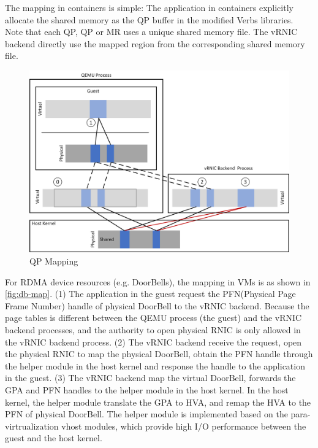  The mapping in containers is simple: The application in containers explicitly allocate the shared memory as the QP buffer in the modified Verbs libraries. Note that each QP, QP or MR uses a unique shared memory file. The vRNIC backend directly use the mapped region from the corresponding shared memory file.
\begin{figure}[!ht]
	\centering
	\includegraphics[width=1\linewidth]{images/qp-map.png}
	\caption{QP Mapping}
	\label{fig:qp-map}
\end{figure}

 

 For RDMA device resources (e.g. DoorBells), the mapping in VMs is as shown in  \ref{fig:db-map}. (1) The application in the guest request the PFN(Physical Page Frame Number) handle of physical DoorBell to the vRNIC backend. Because the page tables is different between the QEMU process (the guest) and the vRNIC backend processes, and the authority to open physical RNIC is only allowed in the vRNIC backend process. (2) The vRNIC backend receive the request, open the physical RNIC to map the physical DoorBell, obtain the PFN handle through the helper module in the host kernel and response the handle to the application in the guest. (3) The vRNIC backend map the virtual DoorBell, forwards the GPA and PFN handles to the helper module in the host kernel. In the host kernel, the helper module translate the GPA to HVA, and remap the HVA to the PFN of physical DoorBell. The helper module is implemented based on the para-virtrualization vhost modules, which provide high I/O performance  between the guest and the host kernel.
 
